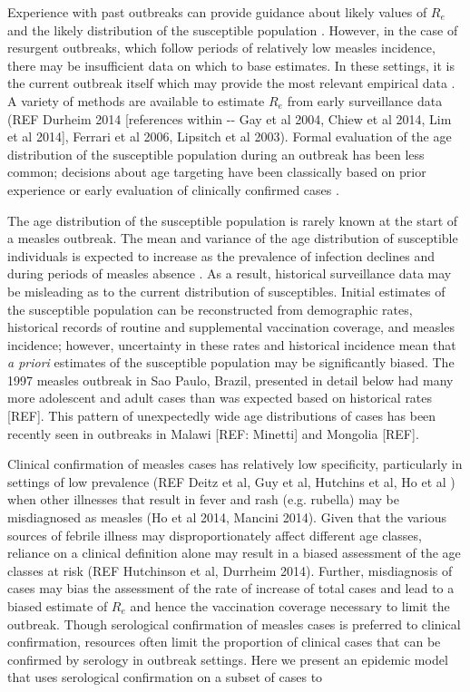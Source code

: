 Experience with past outbreaks can provide guidance about likely values
of \(R_{e}\) \cite{Durrheim_2014} and the likely distribution of the
susceptible population \cite{Goodson_2011, 25803382}. However, in
the case of resurgent outbreaks, which follow periods of relatively low
measles incidence, there may be insufficient data on which to base
estimates. In these settings, it is the current outbreak itself which
may provide the most relevant empirical data \cite{Durrheim_2014, Merl_2009, Shea_2014}. A variety of methods are available to estimate \(R_{e}\) from early surveillance data \cite{Durrheim_2014} (REF Durheim 2014 {[}references
within -\/- Gay et al 2004, Chiew et al 2014, Lim et al 2014{]}, Ferrari
et al 2006, Lipsitch et al 2003). Formal evaluation of the age
distribution of the susceptible population during an outbreak has been
less common; decisions about age targeting have been classically based
on prior experience or early evaluation of clinically confirmed cases \cite{Minetti_2013a}.

The age distribution of the susceptible population is rarely known at
the start of a measles outbreak. The mean and variance of the age
distribution of susceptible individuals is expected to increase as the
prevalence of infection declines \cite{Goodson_2011, Ferrari_2013} and
during periods of measles absence \cite{Durrheim_2014}. As a result,
historical surveillance data may be misleading as to the current
distribution of susceptibles. Initial estimates of the susceptible
population can be reconstructed from demographic rates, historical
records of routine and supplemental vaccination coverage, and measles
incidence; however, uncertainty in these rates and historical incidence
mean that \emph{a priori} estimates of the susceptible population may be
significantly biased. The 1997 measles outbreak in Sao Paulo, Brazil,
presented in detail below had many more adolescent and adult cases than
was expected based on historical rates {[}REF{]}. This pattern of
unexpectedly wide age distributions of cases has been recently seen in
outbreaks in Malawi {[}REF: Minetti{]} and Mongolia {[}REF{]}.

Clinical confirmation of measles cases has relatively low specificity,
particularly in settings of low prevalence (REF Deitz et al, Guy et al,
Hutchins et al, Ho et al ) when other illnesses that result in fever and
rash (e.g. rubella) may be misdiagnosed as measles (Ho et al 2014,
Mancini 2014). Given that the various sources of febrile illness may
disproportionately affect different age classes, reliance on a clinical
definition alone may result in a biased assessment of the age classes at
risk (REF Hutchinson et al, Durrheim 2014). Further, misdiagnosis of
cases may bias the assessment of the rate of increase of total cases and
lead to a biased estimate of \(R_{e}\) and hence the vaccination
coverage necessary to limit the outbreak. Though serological
confirmation of measles cases is preferred to clinical confirmation,
resources often limit the proportion of clinical cases that can be
confirmed by serology in outbreak settings. Here we present an epidemic
model that uses serological confirmation on a subset of cases to

